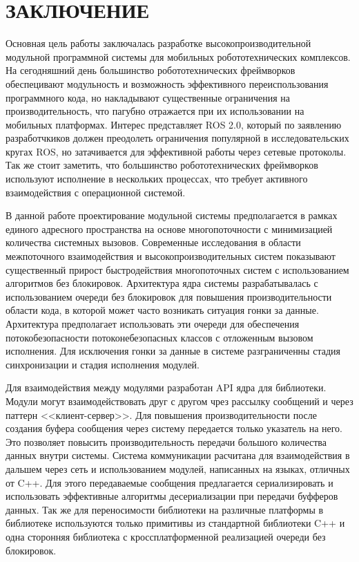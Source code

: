 \chapter*{ЗАКЛЮЧЕНИЕ}

Основная цель работы заключалась разработке высокопроизводительной модульной программной системы для мобильных робототехнических комплексов. На сегодняшний день большинство робототехнических фреймворков обеспецивают модульность и возможность эффективного переиспользования программного кода, но накладывают существенные ограничения на производительность, что пагубно отражается при их использовании на мобильных платформах. Интерес представляет ROS 2.0, который по заявлению разработчкиков должен преодолеть ограничения популярной в исследовательских кругах ROS, но затачивается для эффективной работы через сетевые протоколы. Так же стоит заметить, что большинство робототехнических фреймворков используют исполнение в нескольких процессах, что требует активного взаимодействия с операционной системой.

В данной работе проектирование модульной системы предполагается в рамках единого адресного пространства на основе многопоточности с минимизацией количества системных вызовов. Современные исследования в области межпоточного взаимодействия и высокопроизводительных систем показывают существенный прирост быстродействия многопоточных систем с использованием алгоритмов без блокировок. Архитектура ядра системы разрабатывалась с использованием очереди без блокировок для повышения производительности области кода, в которой может часто возникать ситуация гонки за данные. Архитектура предполагает использовать эти очереди для обеспечения потокобезопасности потоконебезопасных классов с отложенным вызовом исполнения. Для исключения гонки за данные в системе разграниченны стадия синхронизации и стадия исполнения модулей.

Для взаимодействия между модулями разработан API ядра для библиотеки. Модули могут взаимодействовать друг с другом чрез рассылку сообщений и через паттерн <<клиент-сервер>>. Для повышения производительности после создания буфера сообщения через систему передается только указатель на него. Это позволяет повысить производительность передачи большого количества данных внутри системы. Система коммуникации расчитана для взаимодействия в дальшем через сеть и использованием модулей, написанных на языках, отличных от C++. Для этого передаваемые сообщения предлагается сериализировать и использовать эффективные алгоритмы десериализации при передачи буфферов данных. Так же для переносимости библиотеки на различные платформы в библиотеке используются только примитивы из стандартной библиотеки C++ и одна сторонняя библиотека с кроссплатформенной реализацией очереди без блокировок.


